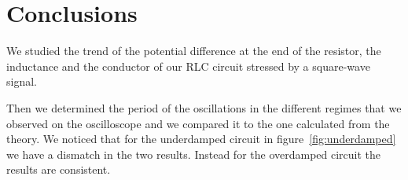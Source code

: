 \documentclass[notitlepage]{report}
\newcounter{theo}[section]\setcounter{theo}{0}
\numberwithin{equation}{section}
\theoremstyle{plain}
\theoremstyle{definition}
\theoremstyle{remark}
\begin{document}
\section{Conclusions}

We studied the trend of the potential difference at the end of the resistor, the
inductance and the conductor of our RLC circuit stressed by a square-wave
signal.

Then we determined the period of the oscillations in the different regimes that
we observed on the oscilloscope and we compared it to the one calculated from
the theory. We noticed that for the underdamped circuit in
figure~\ref{fig:underdamped} we have a dismatch in the two results. Instead for
the overdamped circuit the results are consistent.
\end{document}
